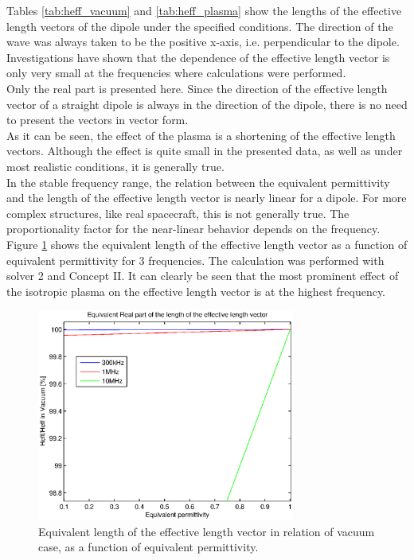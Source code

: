 \documentclass[two-column,ras]{agutex}
\begin{document}
\begin{article}
Tables \ref{tab:heff_vacuum} and \ref{tab:heff_plasma} show the lengths of the effective length vectors of the dipole under the specified conditions. The direction of the wave was always taken to be the positive x-axis, i.e. perpendicular to the dipole. Investigations have shown that the dependence of the effective length vector is only very small at the frequencies where calculations were performed.\\

Only the real part is presented here. Since the direction of the effective length vector of a straight dipole is always in the direction of the dipole, there is no need to present the vectors in vector form.\\

As it can be seen, the effect of the plasma is a shortening of the effective length vectors. Although the effect is quite small in the presented data, as well as under most realistic conditions, it is generally true.\\

In the stable frequency range, the relation between the equivalent permittivity and the length of the effective length vector is nearly linear for a dipole. For more complex structures, like real spacecraft, this is not generally true. The proportionality factor for the near-linear behavior depends on the frequency. Figure \ref{fig:relative_heff_shortening} shows the equivalent length of the effective length vector as a function of equivalent permittivity for 3 frequencies. The calculation was performed with solver 2 and Concept II. It can clearly be seen that the most prominent effect of the isotropic plasma on the effective length vector is at the highest frequency.\\

\begin{figure}
  \noindent\includegraphics[width=20pc]{heff_shortening_dipole.eps}
\caption{Equivalent length of the effective length vector in relation of vacuum case, as a function of equivalent permittivity.}
\label{fig:relative_heff_shortening}
\end{figure}


\end{article}
\end{document}
